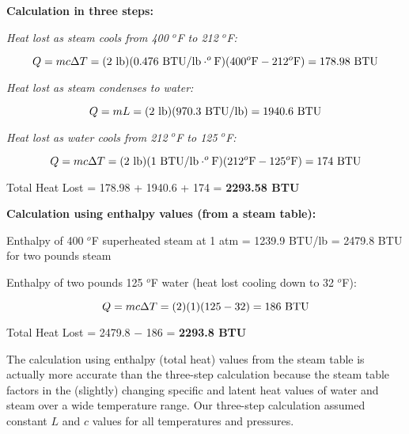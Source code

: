





\noindent
{\bf Calculation in three steps:}

\vskip 10pt

\noindent
{\it Heat lost as steam cools from 400 $^{o}$F to 212 $^{o}$F:}

$$Q = mc \Delta T = (2 \hbox{ lb})(0.476 \hbox{ BTU/lb}\cdot^o\hbox{F})(400^o\hbox{F} - 212^o\hbox{F}) = 178.98 \hbox{ BTU}$$

\vskip 10pt

\noindent
{\it Heat lost as steam condenses to water:}

$$Q = mL = (2 \hbox{ lb})(970.3 \hbox{ BTU/lb}) = 1940.6 \hbox{ BTU}$$

\vskip 10pt

\noindent
{\it Heat lost as water cools from 212 $^{o}$F to 125 $^{o}$F:}

$$Q = mc \Delta T = (2 \hbox{ lb})(1 \hbox{ BTU/lb}\cdot^o\hbox{F})(212^o\hbox{F} - 125^o\hbox{F}) = 174 \hbox{ BTU}$$

\vskip 10pt

Total Heat Lost = 178.98 + 1940.6 + 174 = {\bf 2293.58 BTU}

\vskip 30pt

\noindent
{\bf Calculation using enthalpy values (from a steam table):}

\vskip 10pt

\noindent
Enthalpy of 400 $^{o}$F superheated steam at 1 atm = 1239.9 BTU/lb = 2479.8 BTU for two pounds steam

\vskip 10pt

\noindent
Enthalpy of two pounds 125 $^{o}$F water (heat lost cooling down to 32 $^{o}$F):

$$Q = mc \Delta T = (2)(1)(125 - 32) = 186 \hbox{ BTU}$$

\vskip 10pt

Total Heat Lost = 2479.8 $-$ 186 = {\bf 2293.8 BTU}







The calculation using enthalpy (total heat) values from the steam table is actually more accurate than the three-step calculation because the steam table factors in the (slightly) changing specific and latent heat values of water and steam over a wide temperature range.  Our three-step calculation assumed constant $L$ and $c$ values for all temperatures and pressures.

